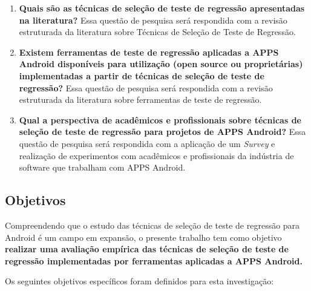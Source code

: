 \begin{enumerate}[label=\bf QP\arabic*,leftmargin=1.8cm]
    
    \item \textbf{Quais são as técnicas de seleção de teste de regressão apresentadas na literatura?} Essa questão de pesquisa será respondida com a revisão estruturada da literatura sobre Técnicas de Seleção de Teste de Regressão.
    
    \item \textbf{Existem ferramentas de teste de regressão aplicadas a \ac{APPS} Android disponíveis para utilização (open source ou proprietárias) implementadas a partir de técnicas de seleção de teste de regressão?} Essa questão de pesquisa será respondida com a revisão estruturada da literatura sobre ferramentas de teste de regressão.
    
    \item \textbf{Qual a perspectiva de acadêmicos e profissionais sobre técnicas de seleção de teste de regressão para projetos de \ac{APPS} Android?} Essa questão de pesquisa será respondida com a aplicação de um \textit{Survey} e realização de experimentos com acadêmicos e profissionais da indústria de software que trabalham com \ac{APPS} Android.
    

\end{enumerate}



\subsection{Objetivos}

Compreendendo que o estudo das técnicas de seleção de teste de regressão para Android é um campo em expansão, o presente trabalho tem como objetivo \textbf{realizar uma avaliação empírica das técnicas de seleção de teste de regressão implementadas por ferramentas aplicadas a \ac{APPS} Android.}

Os seguintes objetivos específicos foram definidos para esta investigação:

